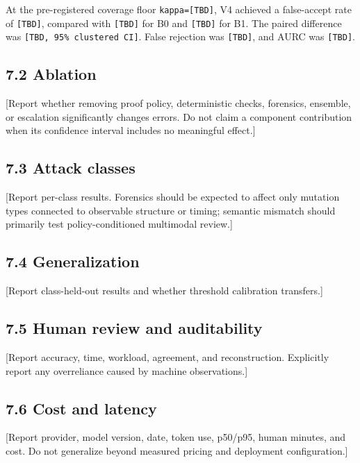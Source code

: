 \documentclass[11pt]{article}
\begin{document}
At the pre-registered coverage floor \texttt{kappa=[TBD]}, V4 achieved a false-accept rate of \texttt{[TBD]}, compared with \texttt{[TBD]} for B0 and \texttt{[TBD]} for B1. The paired difference was \texttt{[TBD, 95\% clustered CI]}. False rejection was \texttt{[TBD]}, and AURC was \texttt{[TBD]}.\par

\subsection{7.2 Ablation}

[Report whether removing proof policy, deterministic checks, forensics, ensemble, or escalation significantly changes errors. Do not claim a component contribution when its confidence interval includes no meaningful effect.]\par

\subsection{7.3 Attack classes}

[Report per-class results. Forensics should be expected to affect only mutation types connected to observable structure or timing; semantic mismatch should primarily test policy-conditioned multimodal review.]\par

\subsection{7.4 Generalization}

[Report class-held-out results and whether threshold calibration transfers.]\par

\subsection{7.5 Human review and auditability}

[Report accuracy, time, workload, agreement, and reconstruction. Explicitly report any overreliance caused by machine observations.]\par

\subsection{7.6 Cost and latency}

[Report provider, model version, date, token use, p50/p95, human minutes, and cost. Do not generalize beyond measured pricing and deployment configuration.]\par
\end{document}
